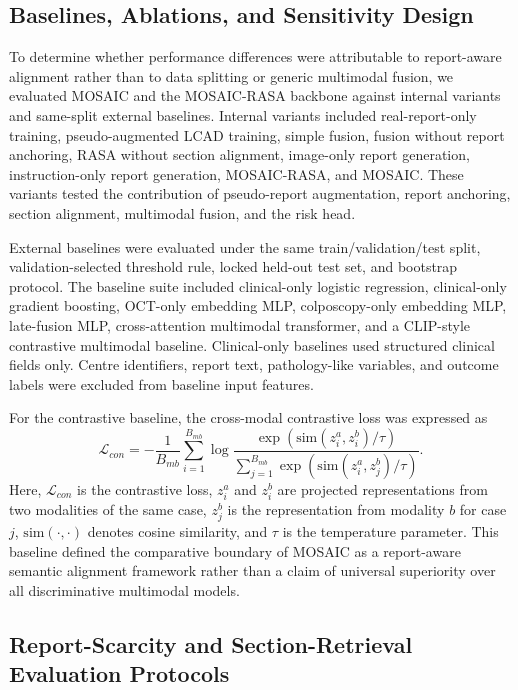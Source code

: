 \documentclass[11pt, a4paper]{article}
\theoremstyle{plain}
\theoremstyle{definition}
\begin{document}
\subsection{Baselines, Ablations, and Sensitivity Design}
\label{subsec:methods_baselines}

To determine whether performance differences were attributable to report-aware alignment rather than to data splitting or generic multimodal fusion, we evaluated MOSAIC and the MOSAIC-RASA backbone against internal variants and same-split external baselines. Internal variants included real-report-only training, pseudo-augmented LCAD training, simple fusion, fusion without report anchoring, RASA without section alignment, image-only report generation, instruction-only report generation, MOSAIC-RASA, and MOSAIC. These variants tested the contribution of pseudo-report augmentation, report anchoring, section alignment, multimodal fusion, and the risk head.

External baselines were evaluated under the same train/validation/test split, validation-selected threshold rule, locked held-out test set, and bootstrap protocol. The baseline suite included clinical-only logistic regression, clinical-only gradient boosting, OCT-only embedding MLP, colposcopy-only embedding MLP, late-fusion MLP, cross-attention multimodal transformer, and a CLIP-style contrastive multimodal baseline. Clinical-only baselines used structured clinical fields only. Centre identifiers, report text, pathology-like variables, and outcome labels were excluded from baseline input features.

For the contrastive baseline, the cross-modal contrastive loss was expressed as
\begin{equation}
\mathcal{L}_{con}
=
-\frac{1}{B_{mb}}
\sum_{i=1}^{B_{mb}}
\log
\frac{
\exp(\mathrm{sim}(z_i^{a},z_i^{b})/\tau)
}{
\sum_{j=1}^{B_{mb}}
\exp(\mathrm{sim}(z_i^{a},z_j^{b})/\tau)
}.
\end{equation}
Here, \(\mathcal{L}_{con}\) is the contrastive loss, \(z_i^{a}\) and \(z_i^{b}\) are projected representations from two modalities of the same case, \(z_j^{b}\) is the representation from modality \(b\) for case \(j\), \(\mathrm{sim}(\cdot,\cdot)\) denotes cosine similarity, and \(\tau\) is the temperature parameter. This baseline defined the comparative boundary of MOSAIC as a report-aware semantic alignment framework rather than a claim of universal superiority over all discriminative multimodal models.

\subsection{Report-Scarcity and Section-Retrieval Evaluation Protocols}
\label{subsec:methods_scarcity_retrieval}
\end{document}
